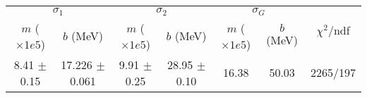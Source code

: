\begin{tabular}{cc|cc|cc||c}
\multicolumn{2}{c|}{$\sigma_1$} & \multicolumn{2}{|c}{$\sigma_2$} & \multicolumn{2}{|c}{$\sigma_G$}  & \multirow{2}{*}{$\chi^2/$ndf}\\
$m$ ($\times1e5$) & $b$ (MeV) & $m$ ($\times1e5$) & $b$ (MeV) & $m$ ($\times1e5$) & $b$ (MeV) & \\
\hline
8.41 $\pm$ 0.15 & 17.226 $\pm$ 0.061 & 9.91 $\pm$ 0.25 & 28.95 $\pm$ 0.10 & 16.38 & 50.03 & 2265/197\\
\end{tabular}
